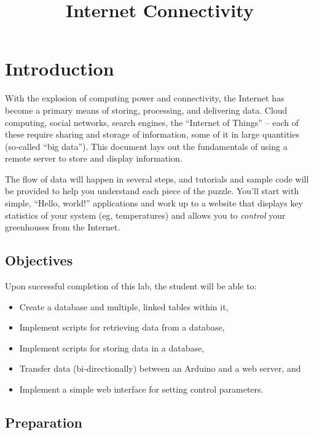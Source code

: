 \documentclass[11pt]{article} %
\title{Internet Connectivity}
\author{}
\date{} %
\begin{document}
\maketitle


\section{Introduction}

With the explosion of computing power and connectivity, the Internet has become a primary means of storing, processing, and delivering data. Cloud computing, social networks, search engines, the ``Internet of Things'' -- each of these require sharing and storage of information, some of it in large quantities (so-called “big data”). This document lays out the fundamentals of using a remote server to store and display information.

The flow of data will happen in several steps, and tutorials and sample code will be provided to help you understand each piece of the puzzle. You’ll start with simple, ``Hello, world!'' applications and work up to a website that displays key statistics of your system (eg, temperatures) and allows you to \emph{control} your greenhouses from the Internet.

\subsection*{Objectives}

Upon successful completion of this lab, the student will be able to:
\begin{itemize}
\item Create a database and multiple, linked tables within it,
\item Implement scripts for retrieving data from a database,
\item Implement scripts for storing data in a database,
\item Transfer data (bi-directionally) between an Arduino and a web server, and
\item Implement a simple web interface for setting control parameters.
\end{itemize}

\subsection*{Preparation}
\end{document}
